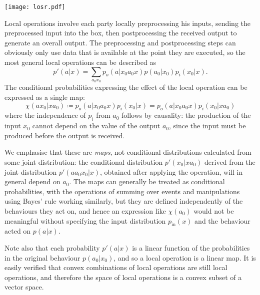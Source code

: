 \documentclass[10pt, a4paper]{article}
\numberwithin{equation}{section} %
\theoremstyle{definition}
\theoremstyle{plain}
\newcommand{\?}{\mathrel{?}} %
\newcommand{\prin}[1][p]{#1_{\mathrm{in}}}
\begin{document}
    \texttt{[image: losr.pdf]}

              Local operations involve each party locally preprocessing his inputs, sending the preprocessed input into the box, then postprocessing the received output to generate an overall output. The preprocessing and postprocessing steps can obviously only use data that is available at the point they are executed, so the most general local operations can be described as~\cite[Def. 4]{LocalTransformations}
              \begin{equation}
                p'(a|x) = \sum_{a_0 x_0} p_o(a|x_0 a_0 x) p(a_0|x_0) p_i(x_0|x).
              \end{equation}
              The conditional probabilities expressing the effect of the local operation can be expressed as a single map:
              \begin{equation}\label{eqn:opmap}
                \chi(a x_0 | x a_0) \coloneqq p_o(a|x_0a_0x) p_i(x_0|x) = p_o(a|x_0a_0x) p_i(x_0|x a_0)
              \end{equation}
              where the independence of \(p_i\) from \(a_0\) follows by causality: the production of the input \(x_0\) cannot depend on the value of the output \(a_0\), since the input must be produced before the output is received.

              We emphasise that these are \emph{maps}, not conditional distributions calculated from some joint distribution: the conditional distribution \(p'(x_0|x a_0)\) derived from the joint distribution \(p'(a a_0 x_0|x)\), obtained after applying the operation, will in general depend on \(a_0\). The maps can generally be treated as conditional probabilities, with the operations of summing over events and manipulations using Bayes' rule working similarly, but they are defined independently of the behaviours they act on, and hence an expression like \(\chi(a_0)\) would not be meaningful without specifying the input distribution \(\prin(x)\) and the behaviour acted on \(p(a|x)\).

              Note also that each probability \(p'(a|x)\) is a linear function of the probabilities in the original behaviour \(p(a_0|x_0)\), and so a local operation is a linear map. It is easily verified that convex combinations of local operations are still local operations, and therefore the space of local operations is a convex subset of a vector space.
\end{document}
